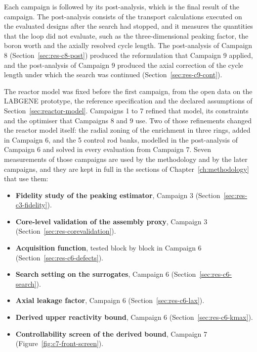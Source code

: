 Each campaign is followed by its post-analysis, which is the final
result of the campaign. The post-analysis consists of the transport calculations executed on the evaluated designs after the search had stopped,
and it measures the quantities that the loop did not evaluate, such as
the three-dimensional peaking factor, the boron worth and the axially
resolved cycle length. The post-analysis of
Campaign 8 (Section~\ref{sec:res-c8-post}) produced the reformulation
that Campaign 9 applied, and the post-analysis of Campaign 9 produced
the axial correction of the cycle length under which the search was
continued (Section~\ref{sec:res-c9-cont}).

The reactor model was fixed before the first campaign, from the open
data on the LABGENE prototype, the reference specification and the
declared assumptions of Section~\ref{sec:reactor-model}. Campaigns 1
to 7 refined that model, its constraints and the optimiser that
Campaigns 8 and 9 use. Two of those refinements changed the reactor
model itself: the radial zoning of the enrichment in three rings, added
in Campaign 6, and the 5 control rod banks, modelled in the
post-analysis of Campaign 6 and solved in every evaluation from
Campaign 7. Seven
measurements of those campaigns are used by the methodology and by the
later campaigns, and they are kept in full in the sections of
Chapter~\ref{ch:methodology} that use them:

\begin{itemize}
  \item \textbf{Fidelity study of the peaking estimator}, Campaign 3
        (Section~\ref{sec:res-c3-fidelity}).

  \item \textbf{Core-level validation of the assembly proxy},
        Campaign 3 (Section~\ref{sec:res-corevalidation}).

  \item \textbf{Acquisition function}, tested block by block in
        Campaign 6 (Section~\ref{sec:res-c6-defects}).

  \item \textbf{Search setting on the surrogates}, Campaign 6
        (Section~\ref{sec:res-c6-search}).

  \item \textbf{Axial leakage factor}, Campaign 6
        (Section~\ref{sec:res-c6-lax}).

  \item \textbf{Derived upper reactivity bound}, Campaign 6
        (Section~\ref{sec:res-c6-kmax}).

  \item \textbf{Controllability screen of the derived bound},
        Campaign 7 (Figure~\ref{fig:c7-front-screen}).
\end{itemize}

